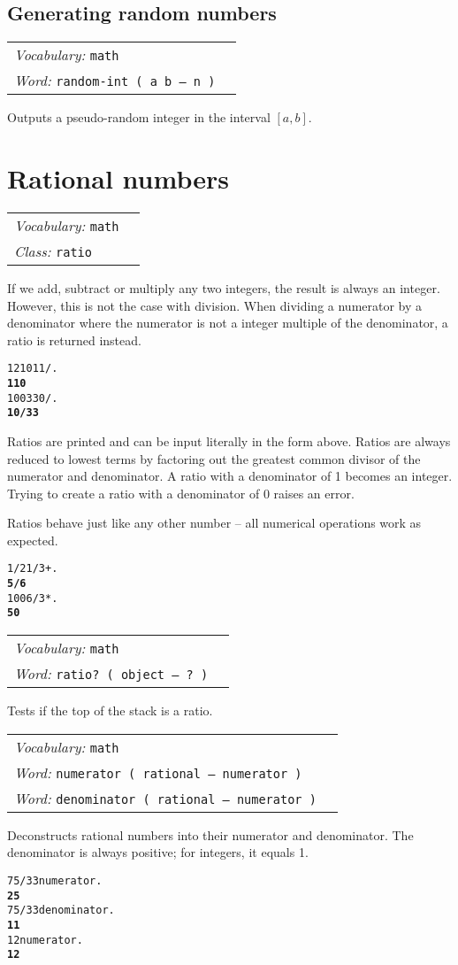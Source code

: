 \documentclass{book}
\newcommand{\vocabulary}[1]{\emph{Vocabulary:} \texttt{#1}&\\}
\newcommand{\ordinaryword}[2]{\index{\texttt{#1}}\emph{Word:} \texttt{#2}&\\}
\newcommand{\classword}[1]{\index{\texttt{#1}}\emph{Class:} \texttt{#1}&\\}
\newcommand{\predword}[1]{\ordinaryword{#1}{#1~( object -- ?~)}}
\newcommand{\wordtable}[1]{


\begin{tabularx}{12cm}{lX}
\hline
#1
\hline
\end{tabularx}

}
\begin{document}
\subsection{Generating random numbers}

\wordtable{
\vocabulary{math}
\ordinaryword{random-int}{random-int ( a b -- n )}
}
Outputs a pseudo-random integer in the interval $[a,b]$.

\section{Rational numbers}\label{ratios}

\newcommand{\rationalglos}{}
\rationalglos
\ratioglos

\wordtable{
\vocabulary{math}
\classword{ratio}
}
If we add, subtract or multiply any two integers, the result is always an integer. However, this is not the case with division. When dividing a numerator by a denominator where the numerator is not a integer multiple of the denominator, a ratio is returned instead.
\begin{alltt}
  1210 11 / .
\textbf{110}
  100 330 / .
\textbf{10/33}
\end{alltt}
Ratios are printed and can be input literally in the form above. Ratios are always reduced to lowest terms by factoring out the greatest common divisor of the numerator and denominator. A ratio with a denominator of 1 becomes an integer. Trying to create a ratio with a denominator of 0 raises an error.

Ratios behave just like any other number -- all numerical operations work as expected.
\begin{alltt}
  1/2 1/3 + .
\textbf{5/6}
  100 6 / 3 * .
\textbf{50}
\end{alltt}
\wordtable{
\vocabulary{math}
\predword{ratio?}
}
Tests if the top of the stack is a ratio.
\wordtable{
\vocabulary{math}
\ordinaryword{numerator}{numerator ( rational -- numerator )}
\ordinaryword{denominator}{denominator ( rational -- numerator )}
}
Deconstructs rational numbers into their numerator and denominator. The denominator is always positive; for integers, it equals 1.
\begin{alltt}
  75/33 numerator .
\textbf{25}
  75/33 denominator .
\textbf{11}
  12 numerator .
\textbf{12}
\end{alltt}
\end{document}

